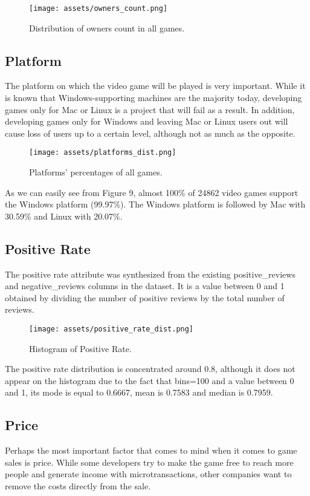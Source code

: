 \documentclass[conference]{IEEEtran}
\begin{document}
\begin{figure}[h]
  \texttt{[image: assets/owners\_count.png]}
  \caption{Distribution of owners count in all games.}
  \label{fig:ownercount1}
\end{figure}


\subsection{Platform}
The platform on which the video game will be played is very important. While it is known that Windows-supporting machines are the majority today, developing games only for Mac or Linux is a project that will fail as a result. In addition, developing games only for Windows and leaving Mac or Linux users out will cause loss of users up to a certain level, although not as much as the opposite.

\begin{figure}[h]
  \texttt{[image: assets/platforms\_dist.png]}
  \caption{Platforms' percentages of all games.}
  \label{fig:platform1}
\end{figure}

As we can easily see from Figure 9, almost 100\% of 24862 video games support the Windows platform (99.97\%). The Windows platform is followed by Mac with 30.59\% and Linux with 20.07\%.

\subsection{Positive Rate}
The positive rate attribute was synthesized from the existing positive\_reviews and negative\_reviews columns in the dataset. It is a value between 0 and 1 obtained by dividing the number of positive reviews by the total number of reviews.

\begin{figure}[h]
  \texttt{[image: assets/positive\_rate\_dist.png]}
  \caption{Histogram of Positive Rate.}
  \label{fig:positiverate1}
\end{figure}

The positive rate distribution is concentrated around 0.8, although it does not appear on the histogram due to the fact that bins=100 and a value between 0 and 1, its mode is equal to 0.6667, mean is 0.7583 and median is 0.7959. \\

\subsection{Price}
Perhaps the most important factor that comes to mind when it comes to game sales is price. While some developers try to make the game free to reach more people and generate income with microtransactions, other companies want to remove the costs directly from the sale.
\end{document}
